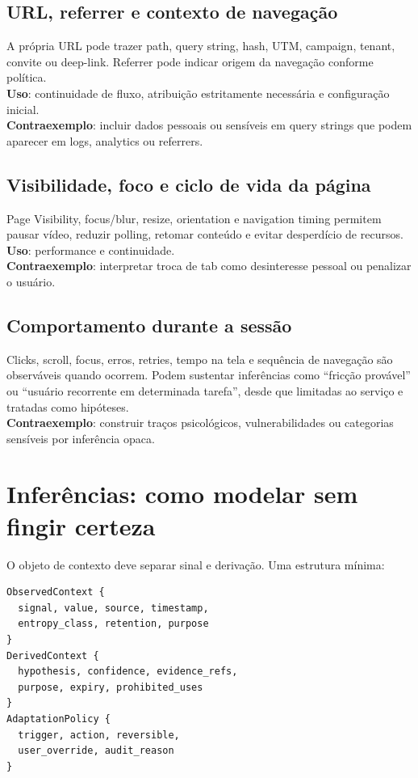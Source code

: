 \documentclass[11pt,a4paper]{article}
\begin{document}
\subsection{URL, referrer e contexto de navegação}
A própria URL pode trazer path, query string, hash, UTM, campaign, tenant, convite ou deep-link. Referrer pode indicar origem da navegação conforme política.\\
\textbf{Uso}: continuidade de fluxo, atribuição estritamente necessária e configuração inicial.\\
\textbf{Contraexemplo}: incluir dados pessoais ou sensíveis em query strings que podem aparecer em logs, analytics ou referrers.

\subsection{Visibilidade, foco e ciclo de vida da página}
Page Visibility, focus/blur, resize, orientation e navigation timing permitem pausar vídeo, reduzir polling, retomar conteúdo e evitar desperdício de recursos.\\
\textbf{Uso}: performance e continuidade.\\
\textbf{Contraexemplo}: interpretar troca de tab como desinteresse pessoal ou penalizar o usuário.

\subsection{Comportamento durante a sessão}
Clicks, scroll, focus, erros, retries, tempo na tela e sequência de navegação são observáveis quando ocorrem. Podem sustentar inferências como ``fricção provável'' ou ``usuário recorrente em determinada tarefa'', desde que limitadas ao serviço e tratadas como hipóteses.\\
\textbf{Contraexemplo}: construir traços psicológicos, vulnerabilidades ou categorias sensíveis por inferência opaca.

\section{Inferências: como modelar sem fingir certeza}
O objeto de contexto deve separar sinal e derivação. Uma estrutura mínima:
\begin{verbatim}
ObservedContext {
  signal, value, source, timestamp,
  entropy_class, retention, purpose
}
DerivedContext {
  hypothesis, confidence, evidence_refs,
  purpose, expiry, prohibited_uses
}
AdaptationPolicy {
  trigger, action, reversible,
  user_override, audit_reason
}
\end{verbatim}
\end{document}
